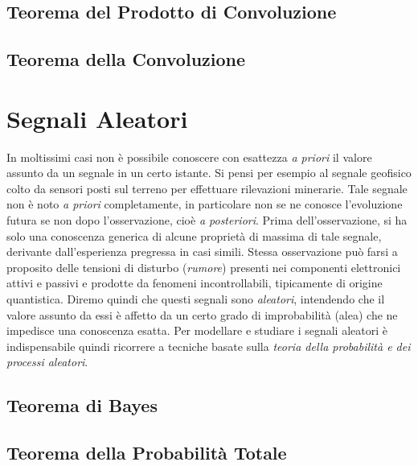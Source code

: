 \documentclass[12pt,oneside,openany]{memoir}
\numberwithin{equation}{subsection}
\begin{document}
\newpage
\subsection{Teorema del Prodotto di Convoluzione}


\newpage
\subsection{Teorema della Convoluzione}


\newpage	
\section{Segnali Aleatori}
In moltissimi casi non \`e possibile conoscere con esattezza \textit{a priori}
il valore assunto da un segnale in un certo istante. Si pensi per esempio al
segnale geofisico colto da sensori posti sul terreno per effettuare rilevazioni
minerarie. Tale segnale non \`e noto \textit{a priori} completamente, in
particolare non se ne conosce l'evoluzione futura se non dopo l'osservazione,
cio\`e \textit{a posteriori}. Prima dell'osservazione, si ha solo una conoscenza
generica di alcune propriet\`a di massima di tale segnale, derivante
dall'esperienza pregressa in casi simili. Stessa osservazione pu\`o farsi a
proposito delle tensioni di disturbo (\textit{rumore}) presenti nei componenti
elettronici attivi e passivi e prodotte da fenomeni incontrollabili, tipicamente
di origine quantistica. Diremo quindi che questi segnali sono \textit{aleatori},
intendendo che il valore assunto da essi \`e affetto da un certo grado di
improbabilit\`a (alea) che ne impedisce una conoscenza esatta. 
Per modellare e studiare i segnali aleatori \`e indispensabile quindi ricorrere
a tecniche basate sulla \textit{teoria della probabilit\`a e dei processi
aleatori}.

\newpage
\subsection{Teorema di Bayes}

\newpage
\subsection{Teorema della Probabilit\`a Totale}
\end{document}
